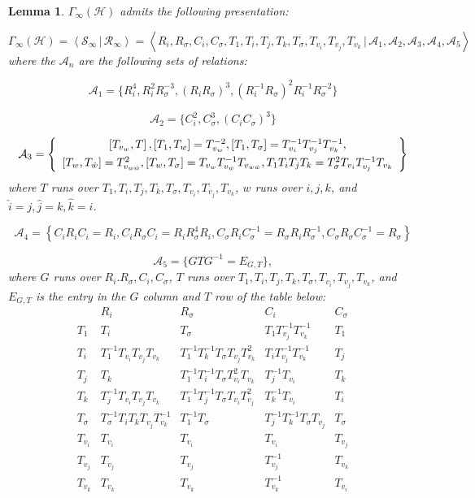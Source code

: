 \documentclass{article}[12pt]
\newtheorem{lem}{Lemma}%
\begin{document}
\begin{lem}\label{inftypres}
$\Gamma_{\infty}(\mathcal{H})$ admits the following presentation:

$$\Gamma_{\infty}(\mathcal{H})=\left\langle \mathcal{S}_\infty \, | \, \mathcal{R}_\infty \right\rangle=\left\langle R_i, R_{\sigma}, C_i, C_{\sigma}, T_1, T_i, T_j, T_k, T_{\sigma}, T_{v_i}, T_{v_j}, T_{v_k} \, | \, \mathcal{A}_1, \mathcal{A}_2, \mathcal{A}_3, \mathcal{A}_4, \mathcal{A}_5\right\rangle$$
where the $\mathcal{A}_n$ are the following sets of relations: 

$$\mathcal{A}_1 = \{R_i^4, R_i^2R_{\sigma}^{-3}, (R_iR_{\sigma})^3, (R_i^{-1}R_{\sigma})^2R_i^{-1}R_{\sigma}^{-2}\}$$

$$\mathcal{A}_2 = \{C_i^2, C_{\sigma}^3, (C_iC_{\sigma})^3\}$$ 

$$\mathcal{A}_3 = \left\{
\begin{array}{c}\left[T_{v_w},T\right], \left[T_1,T_w\right] = T_{v_w}^{-2}, \left[T_1,T_\sigma\right] = T_{v_i}^{-1}T_{v_j}^{-1}T_{v_k}^{-1}, \vspace{.1cm} \\ \left[T_w,T_{\hat{w}}\right] = T_{v_{w\hat{w}}}^2, \left[T_w,T_{\sigma}\right] = T_{v_w}T_{v_{\hat{w}}}^{-1}T_{v_{w\hat{w}}}, T_1T_iT_jT_k = T_\sigma^2T_{v_i}T_{v_j}^{-1}T_{v_k}\end{array} \right\}$$
where $T$ runs over $T_1,T_i,T_j,T_k,T_{\sigma},T_{v_i},T_{v_j},T_{v_k}$, $w$ runs over  $i,j,k$, and $\hat{i} = j, \hat{j} = k, \hat{k} = i$.

$$\mathcal{A}_4 = \left\{ C_iR_iC_i = R_i, C_iR_{\sigma}C_i = R_iR_{\sigma}^4R_i, C_{\sigma}R_iC_{\sigma}^{-1} = R_{\sigma}R_iR_{\sigma}^{-1}, C_{\sigma}R_{\sigma}C_{\sigma}^{-1} = R_{\sigma}\right\}$$

$$\mathcal{A}_5 = \{GTG^{-1} = E_{G,T} \},$$
where $G$ runs over $R_i.R_{\sigma},C_i,C_{\sigma}$, $T$ runs over $T_1,T_i,T_j,T_k,T_{\sigma},T_{v_i},T_{v_j},T_{v_k}$, and $E_{G,T}$ is the entry in the $G$ column and $T$ row of the table below:
$$
\begin{array}{c|cccc}
& R_i & R_{\sigma} & C_i & C_{\sigma}\\\hline
T_1 & T_i & T_{\sigma} & T_1T_{v_j}^{-1}T_{v_k}^{-1} & T_1\\
T_i & T_1^{-1}T_{v_i}T_{v_j}T_{v_k} & T_1^{-1}T_k^{-1}T_{\sigma}T_{v_j}T_{v_k}^2 & T_iT_{v_j}^{-1}T_{v_k}^{-1} & T_j\\
T_j & T_k & T_1^{-1}T_i^{-1}T_{\sigma}T_{v_i}^2T_{v_k} & T_j^{-1}T_{v_i} & T_k\\
T_k & T_j^{-1}T_{v_i}T_{v_j}T_{v_k} & T_1^{-1}T_j^{-1}T_{\sigma}T_{v_i}T_{v_j}^2 & T_k^{-1}T_{v_i} & T_i\\
T_{\sigma} & T_{\sigma}^{-1}T_iT_kT_{v_j}T_{v_k}^{-1} & T_1^{-1}T_{\sigma} & T_j^{-1}T_k^{-1}T_{\sigma}T_{v_j} & T_{\sigma}\\
T_{v_i} & T_{v_i} & T_{v_i} & T_{v_i} & T_{v_j}\\
T_{v_j} & T_{v_j} & T_{v_j} & T_{v_j}^{-1} & T_{v_k}\\
T_{v_k} & T_{v_k} & T_{v_k} & T_{v_k}^{-1} & T_{v_i}
\end{array}
$$

\end{lem}
\end{document}
